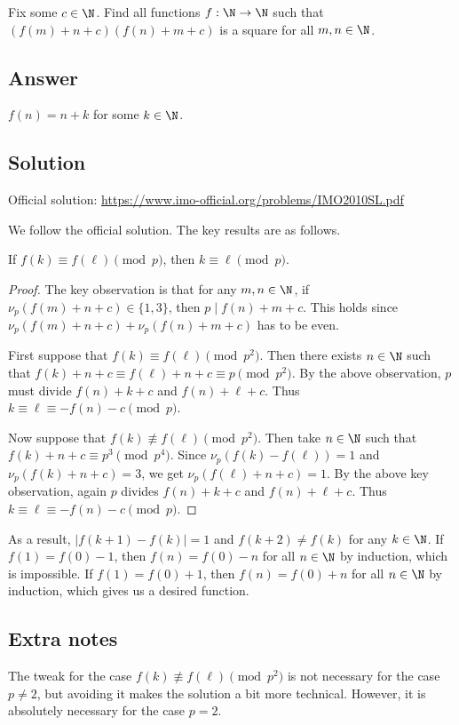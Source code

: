 Fix some $c \in \N$.
Find all functions $f : \N \to \N$ such that $(f(m) + n + c)(f(n) + m + c)$ is a square for all $m, n \in \N$.



\subsection*{Answer}

$f(n) = n + k$ for some $k \in \N$.



\subsection*{Solution}

Official solution: \url{https://www.imo-official.org/problems/IMO2010SL.pdf}

We follow the official solution.
The key results are as follows.

\begin{claim}
If $f(k) \equiv f(\ell) \pmod{p}$, then $k \equiv \ell \pmod{p}$.
\end{claim}
\begin{proof}
The key observation is that for any $m, n \in \N$, if $\nu_p(f(m) + n + c) \in \{1, 3\}$, then $p \mid f(n) + m + c$.
This holds since $\nu_p(f(m) + n + c) + \nu_p(f(n) + m + c)$ has to be even.

First suppose that $f(k) \equiv f(\ell) \pmod{p^2}$.
Then there exists $n \in \N$ such that $f(k) + n + c \equiv f(\ell) + n + c \equiv p \pmod{p^2}$.
By the above observation, $p$ must divide $f(n) + k + c$ and $f(n) + \ell + c$.
Thus $k \equiv \ell \equiv -f(n) - c \pmod{p}$.

Now suppose that $f(k) \not\equiv f(\ell) \pmod{p^2}$.
Then take $n \in \N$ such that $f(k) + n + c \equiv p^3 \pmod{p^4}$.
Since $\nu_p(f(k) - f(\ell)) = 1$ and $\nu_p(f(k) + n + c) = 3$, we get $\nu_p(f(\ell) + n + c) = 1$.
By the above key observation, again $p$ divides $f(n) + k + c$ and $f(n) + \ell + c$.
Thus $k \equiv \ell \equiv -f(n) - c \pmod{p}$.
\end{proof}

As a result, $|f(k + 1) - f(k)| = 1$ and $f(k + 2) \neq f(k)$ for any $k \in \N$.
If $f(1) = f(0) - 1$, then $f(n) = f(0) - n$ for all $n \in \N$ by induction, which is impossible.
If $f(1) = f(0) + 1$, then $f(n) = f(0) + n$ for all $n \in \N$ by induction, which gives us a desired function.



\subsection*{Extra notes}

The tweak for the case $f(k) \not\equiv f(\ell) \pmod{p^2}$ is not necessary for the case $p \neq 2$, but avoiding it makes the solution a bit more technical.
However, it is absolutely necessary for the case $p = 2$.
